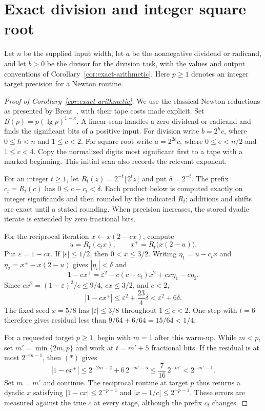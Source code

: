 \documentclass[11pt]{article}
\theoremstyle{definition}
\begin{document}
 \section{Exact division and integer square root}
\label{sec:exact-arithmetic-proof}

Let $n$ be the supplied input width, let $a$ be the nonnegative dividend
or radicand, and let $b>0$ be the divisor for the division task, with
the values and output conventions of Corollary~\ref{cor:exact-arithmetic}.
Here $p\ge1$ denotes an integer target precision for a Newton routine.

\begin{proof}[Proof of Corollary~\ref{cor:exact-arithmetic}]
We use the classical Newton reductions as presented by
Brent~\cite[Lemmas 2.1--2.4]{Brent1976}, with their tape costs made
explicit. Set $B(p)=p(\lg p)^{1-\kappa}$. A linear scan handles a zero
dividend or radicand and finds the significant bits of a positive input.
For division write $b=2^h c$, where $0\le h<n$ and $1\le c<2$.
For square root write $a=2^{2e}c$, where $0\le e<n/2$ and $1\le c<4$.
Copy the normalized digits most significant first to a tape with a marked
beginning. This initial scan also records the relevant exponent.

For an integer $t\ge1$, let
$R_t(z)=2^{-t}\lfloor 2^t z\rfloor$ and put $\delta=2^{-t}$.
The prefix $c_t=R_t(c)$ has $0\le c-c_t<\delta$.
Each product below is computed exactly on integer significands and
then rounded by the indicated $R_t$; additions and shifts are exact
until a stated rounding. When precision increases, the stored dyadic
iterate is extended by zero fractional bits.

For the reciprocal iteration $x\leftarrow x(2-cx)$, compute
\[
 u=R_t(c_t x),\qquad x^+=R_t\bigl(x(2-u)\bigr).
\]
Put $\varepsilon=1-cx$. If $|\varepsilon|\le1/2$, then
$0<x\le3/2$. Writing $\eta_1=u-c_t x$ and
$\eta_2=x^+-x(2-u)$ gives $|\eta_i|<\delta$ and
\[
 1-cx^+
 =\varepsilon^2-c(c-c_t)x^2+cx\eta_1-c\eta_2.
\]
Since $cx^2=(1-\varepsilon)^2/c\le9/4$, $cx\le3/2$, and $c<2$,
\[
 |1-cx^+|
 \le\varepsilon^2+\frac{23}{4}\delta
 <\varepsilon^2+6\delta.                                  \tag{*}
\]
The fixed seed $x=5/8$ has $|\varepsilon|\le3/8$ throughout
$1\le c<2$. One step with $t=6$ therefore gives residual less than
$9/64+6/64=15/64<1/4$.

For a requested target $p\ge1$, begin with $m=1$ after this warm-up.
While $m<p$, set $m'=\min\{2m,p\}$ and work at $t=m'+5$ fractional
bits. If the residual is at most $2^{-m-1}$, then $(*)$ gives
\[
 |1-cx^+|
 \le2^{-2m-2}+6\,2^{-m'-5}
 \le\frac7{16}\,2^{-m'}<2^{-m'-1}.
\]
Set $m=m'$ and continue. The reciprocal routine at target $p$ thus
returns a dyadic $x$ satisfying
$|1-cx|\le2^{-p-1}$ and $|x-1/c|\le2^{-p-1}$.
These errors are measured against the true $c$ at every stage, although
the prefix $c_t$ changes.


\end{proof}
\end{document}
